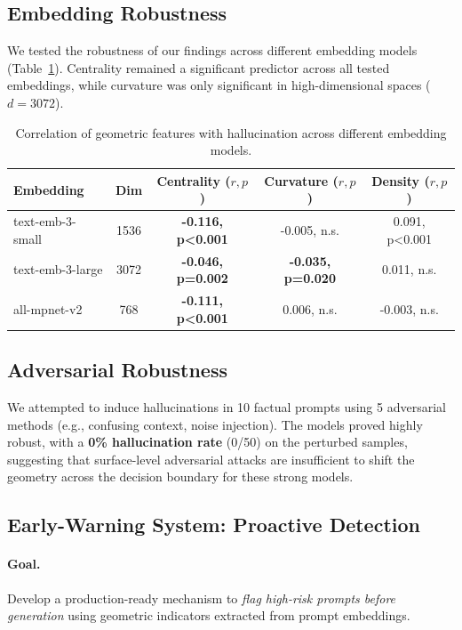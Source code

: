 \documentclass{article}
\begin{document}
\subsection{Embedding Robustness}
We tested the robustness of our findings across different embedding models (Table~\ref{tab:embedding-robustness}). Centrality remained a significant predictor across all tested embeddings, while curvature was only significant in high-dimensional spaces ($d=3072$).

\begin{table}[h]
    \centering
    \begin{tabular}{lcccc}
        \toprule
        \textbf{Embedding} & \textbf{Dim} & \textbf{Centrality ($r, p$)} & \textbf{Curvature ($r, p$)} & \textbf{Density ($r, p$)} \\
        \midrule
        text-emb-3-small & 1536 & \textbf{-0.116, p<0.001} & -0.005, n.s. & 0.091, p<0.001 \\
        text-emb-3-large & 3072 & \textbf{-0.046, p=0.002} & \textbf{-0.035, p=0.020} & 0.011, n.s. \\
        all-mpnet-v2 & 768 & \textbf{-0.111, p<0.001} & 0.006, n.s. & -0.003, n.s. \\
        \bottomrule
    \end{tabular}
    \caption{Correlation of geometric features with hallucination across different embedding models.}
    \label{tab:embedding-robustness}
\end{table}

\subsection{Adversarial Robustness}
We attempted to induce hallucinations in 10 factual prompts using 5 adversarial methods (e.g., confusing context, noise injection). The models proved highly robust, with a \textbf{0\% hallucination rate} (0/50) on the perturbed samples, suggesting that surface-level adversarial attacks are insufficient to shift the geometry across the decision boundary for these strong models.

\subsection{Early-Warning System: Proactive Detection}
\label{sec:early-warning}

\paragraph{Goal.} Develop a production-ready mechanism to \emph{flag high-risk prompts before generation} using geometric indicators extracted from prompt embeddings.
\end{document}
